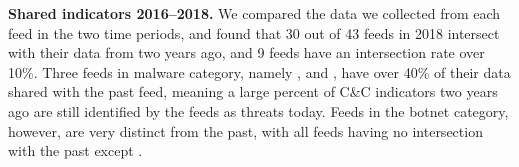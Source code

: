 \noindent\textbf{Shared indicators 2016--2018.}
We compared the data we collected from each feed in the two time periods, and found that 30
out of 43 feeds in 2018 intersect with their data from two years ago, and 9 feeds have
an intersection rate over 10\%. Three feeds in malware category, namely {\feedfeodo},
{\feedTSAbusech} and {\feedzeus}, have over 40\% of their data shared with the past feed,
meaning a large percent of C\&C indicators two years ago are still
identified by the feeds as threats today. Feeds in the botnet category, however, are very distinct from the
past, with all feeds having no intersection with the past except {\feedetiprep}.

